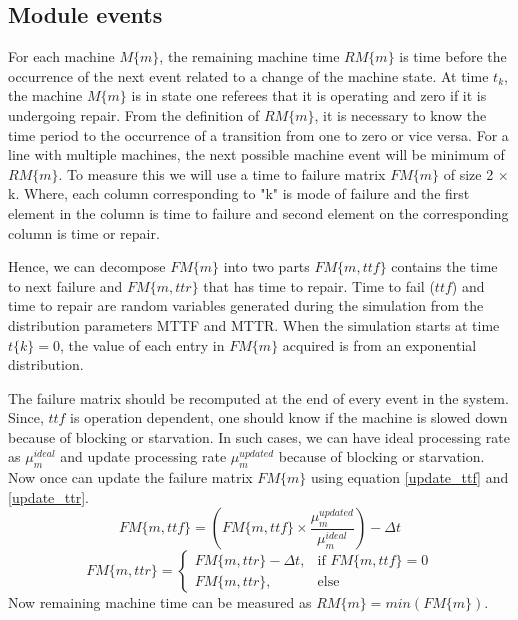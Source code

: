 \subsection{Module events}
 For each machine $M \lbrace m \rbrace$, the remaining machine time $RM \lbrace m \rbrace$ is time before the occurrence of the next event related to a change of the machine state. At time $t_k$, the machine $M \lbrace m \rbrace$ is in state one referees that it is operating and zero if it is undergoing repair. From the definition of $RM \lbrace m \rbrace$, it is necessary to know the time period to the occurrence of a transition from one to zero or vice versa. For a line with multiple machines, the next possible machine event will be minimum of $RM \lbrace m \rbrace$.
To measure this we will use a time to failure matrix $FM \lbrace m \rbrace$ of size 2 $\times$ k. Where, each column corresponding to "k" is mode of failure and the first element in the column is time to failure and second element on the corresponding column is time or repair. \par
Hence, we can decompose $FM \lbrace m \rbrace$ into two parts $FM \lbrace m, ttf \rbrace$ contains the time to next failure and $FM \lbrace m, ttr \rbrace$ that has time to repair.
Time to fail ($ttf$) and time to repair are random variables generated during the simulation from the distribution parameters MTTF and MTTR. When the simulation starts at time $t \lbrace k \rbrace = 0$, the value of each entry in $FM \lbrace m \rbrace$ acquired is from an exponential distribution.\par 
The failure matrix should be recomputed at the end of every event in the system. Since, $ttf$ is operation dependent, one should know if the machine is slowed down because of blocking or starvation. In such cases, we can have ideal processing rate as $\mu^{ideal}_m$ and update processing rate $\mu^{updated}_m$ because of blocking or starvation. Now once can update the failure matrix $FM \lbrace m \rbrace$ using equation \ref{update_ttf} and \ref{update_ttr}.
\begin{equation}\label{update_ttf}
    FM \lbrace m, ttf \rbrace= 
        (FM \lbrace m, ttf \rbrace \times \frac{\mu^{updated}_m }{\mu^{ideal}_m}) - \Delta t
\end{equation}
\begin{equation}\label{update_ttr}
    FM \lbrace m, ttr \rbrace= 
    \begin{cases}
        FM \lbrace m, ttr \rbrace - \Delta t,& \text{if } FM \lbrace m, ttf \rbrace  = 0\\
        FM \lbrace m, ttr \rbrace,    & \text{else}
    \end{cases}
\end{equation}
Now remaining machine time can be measured as $RM \lbrace m \rbrace = min(FM \lbrace m \rbrace)$. 
